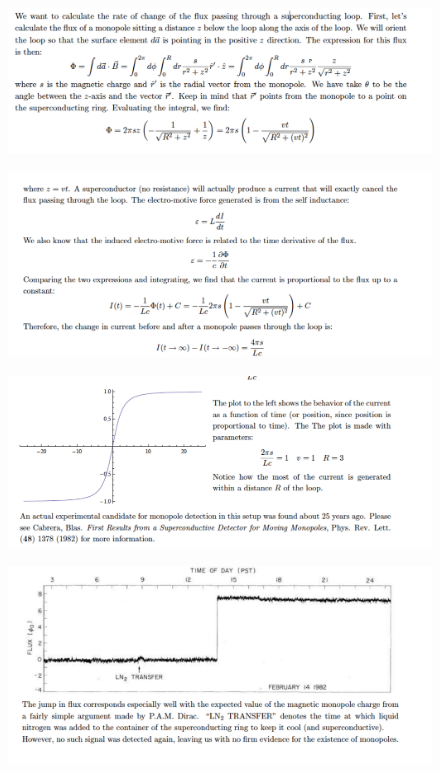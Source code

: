 \documentclass[makesolutionspdf]{esg8022pset}
\begin{document}
\begin{solution}
  \begin{figure}[H]
    \centering
    \includegraphics[width = 15cm]{mono_sol_a}
  \end{figure}
  \begin{figure}[H]
    \centering
    \includegraphics[width = 15cm]{mono_sol_b}
  \end{figure}
  \begin{figure}[H]
    \centering
    \includegraphics[width = 15cm]{monopole_sol_c}
  \end{figure} 
  \begin{figure}[H]
    \centering
    \includegraphics[width = 15cm]{monopole_sol_d}
  \end{figure}
\end{solution}
\end{document}
